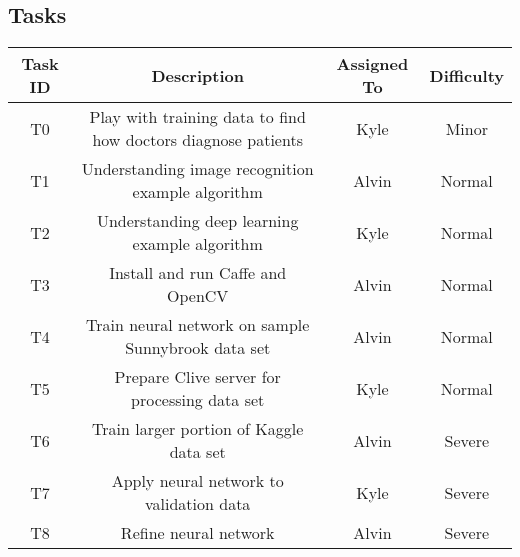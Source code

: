 \documentclass[12pt]{article}
\begin{document}
\subsection{Tasks}
\begin{center}
	\begin{tabular}{|c|c|c|c|}
		\hline
		Task ID & Description & Assigned To & Difficulty \\
		\hline
		T0 & Play with training data to find how doctors diagnose patients & Kyle & Minor \\
		T1 & Understanding image recognition example algorithm & Alvin & Normal \\
		T2 & Understanding deep learning example algorithm & Kyle & Normal \\
		T3 & Install and run Caffe and OpenCV & Alvin & Normal \\
		T4 & Train neural network on sample Sunnybrook data set & Alvin & Normal \\
		T5 & Prepare Clive server for processing data set & Kyle & Normal \\
		T6 & Train larger portion of Kaggle data set & Alvin & Severe \\
		T7 & Apply neural network to validation data & Kyle & Severe \\
		T8 & Refine neural network & Alvin & Severe \\
		\hline
	\end{tabular}
\end{center}
\end{document}
